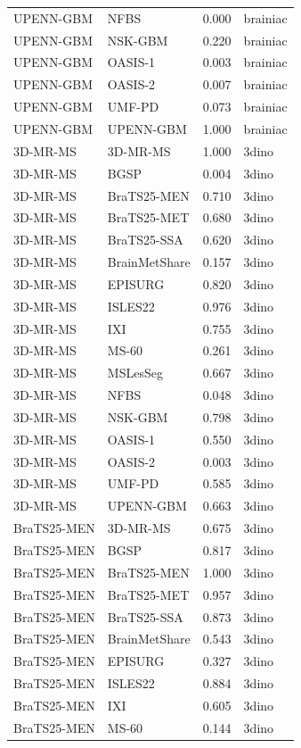 \begin{tabular}{llrl}
UPENN-GBM & NFBS & 0.000 & brainiac \\
UPENN-GBM & NSK-GBM & 0.220 & brainiac \\
UPENN-GBM & OASIS-1 & 0.003 & brainiac \\
UPENN-GBM & OASIS-2 & 0.007 & brainiac \\
UPENN-GBM & UMF-PD & 0.073 & brainiac \\
UPENN-GBM & UPENN-GBM & 1.000 & brainiac \\
3D-MR-MS & 3D-MR-MS & 1.000 & 3dino \\
3D-MR-MS & BGSP & 0.004 & 3dino \\
3D-MR-MS & BraTS25-MEN & 0.710 & 3dino \\
3D-MR-MS & BraTS25-MET & 0.680 & 3dino \\
3D-MR-MS & BraTS25-SSA & 0.620 & 3dino \\
3D-MR-MS & BrainMetShare & 0.157 & 3dino \\
3D-MR-MS & EPISURG & 0.820 & 3dino \\
3D-MR-MS & ISLES22 & 0.976 & 3dino \\
3D-MR-MS & IXI & 0.755 & 3dino \\
3D-MR-MS & MS-60 & 0.261 & 3dino \\
3D-MR-MS & MSLesSeg & 0.667 & 3dino \\
3D-MR-MS & NFBS & 0.048 & 3dino \\
3D-MR-MS & NSK-GBM & 0.798 & 3dino \\
3D-MR-MS & OASIS-1 & 0.550 & 3dino \\
3D-MR-MS & OASIS-2 & 0.003 & 3dino \\
3D-MR-MS & UMF-PD & 0.585 & 3dino \\
3D-MR-MS & UPENN-GBM & 0.663 & 3dino \\
BraTS25-MEN & 3D-MR-MS & 0.675 & 3dino \\
BraTS25-MEN & BGSP & 0.817 & 3dino \\
BraTS25-MEN & BraTS25-MEN & 1.000 & 3dino \\
BraTS25-MEN & BraTS25-MET & 0.957 & 3dino \\
BraTS25-MEN & BraTS25-SSA & 0.873 & 3dino \\
BraTS25-MEN & BrainMetShare & 0.543 & 3dino \\
BraTS25-MEN & EPISURG & 0.327 & 3dino \\
BraTS25-MEN & ISLES22 & 0.884 & 3dino \\
BraTS25-MEN & IXI & 0.605 & 3dino \\
BraTS25-MEN & MS-60 & 0.144 & 3dino \\

\end{tabular}
